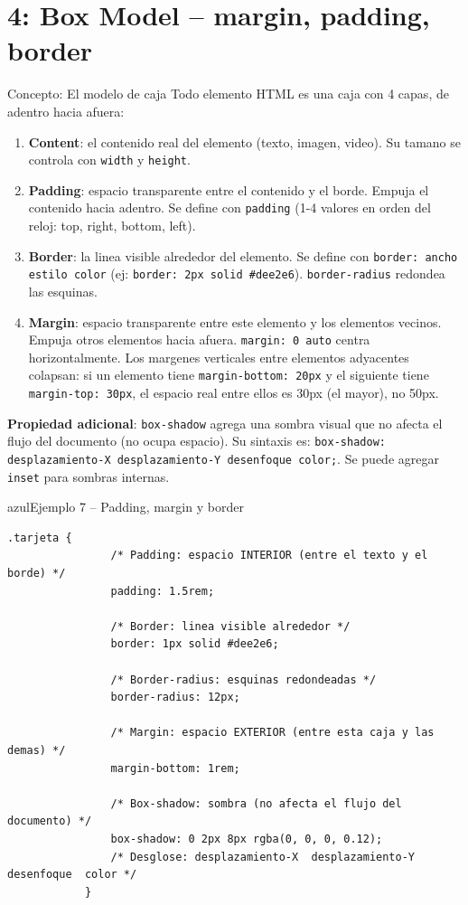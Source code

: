\documentclass[11pt,a4paper]{article}
\begin{document}
	\section{4: Box Model -- margin, padding, border}
	
	\begin{cajaconcepto}{Concepto: El modelo de caja}
		Todo elemento HTML es una caja con 4 capas, de adentro hacia afuera:
		
		\begin{enumerate}[leftmargin=1.5em,itemsep=3pt]
			\item \textbf{Content}: el contenido real del elemento (texto, imagen, video). Su tamano se controla con \texttt{width} y \texttt{height}.
			\item \textbf{Padding}: espacio transparente entre el contenido y el borde. Empuja el contenido hacia adentro. Se define con \texttt{padding} (1-4 valores en orden del reloj: top, right, bottom, left).
			\item \textbf{Border}: la linea visible alrededor del elemento. Se define con \texttt{border: ancho estilo color} (ej: \texttt{border: 2px solid \#dee2e6}). \texttt{border-radius} redondea las esquinas.
			\item \textbf{Margin}: espacio transparente entre este elemento y los elementos vecinos. Empuja otros elementos hacia afuera. \texttt{margin: 0 auto} centra horizontalmente. Los margenes verticales entre elementos adyacentes colapsan: si un elemento tiene \texttt{margin-bottom: 20px} y el siguiente tiene \texttt{margin-top: 30px}, el espacio real entre ellos es 30px (el mayor), no 50px.
		\end{enumerate}
		
		\textbf{Propiedad adicional}: \texttt{box-shadow} agrega una sombra visual que no afecta el flujo del documento (no ocupa espacio). Su sintaxis es: \texttt{box-shadow: desplazamiento-X desplazamiento-Y desenfoque color;}. Se puede agregar \texttt{inset} para sombras internas.
	\end{cajaconcepto}
	
	\begin{cajacodigo}{azul}{Ejemplo 7 -- Padding, margin y border}
		\begin{lstlisting}[style=codecss]
			.tarjeta {
				/* Padding: espacio INTERIOR (entre el texto y el borde) */
				padding: 1.5rem;
				
				/* Border: linea visible alrededor */
				border: 1px solid #dee2e6;
				
				/* Border-radius: esquinas redondeadas */
				border-radius: 12px;
				
				/* Margin: espacio EXTERIOR (entre esta caja y las demas) */
				margin-bottom: 1rem;
				
				/* Box-shadow: sombra (no afecta el flujo del documento) */
				box-shadow: 0 2px 8px rgba(0, 0, 0, 0.12);
				/* Desglose: desplazamiento-X  desplazamiento-Y  desenfoque  color */
			}
		\end{lstlisting}
	\end{cajacodigo}
	
\end{document}
